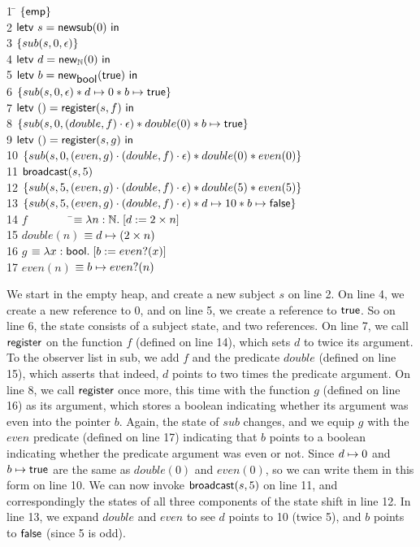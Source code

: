 \documentclass[preprint,natbib]{sigplanconf}
\begin{document}
{\small
\begin{tabbing}
1 \qquad \= 
$\{{\mathsf{emp}}\}$ \\
2 \> 
$\mbox{\textsf{{letv }}}s = \mbox{\textsf{{newsub}}}(0)\mbox{\textsf{{ in }}}$ \\
3 \> $\{{sub(s, 0, \epsilon)}\}$ \\
4 \> $\mbox{\textsf{{letv }}}d = \mbox{\textsf{{new}}}_{\mathbb{N}} (0)\mbox{\textsf{{ in }}}$ \\
5 \> $\mbox{\textsf{{letv }}}b = \mbox{\textsf{{new}}}_{\mbox{\textsf{{bool}}}} (\mbox{\textsf{{true}}})\mbox{\textsf{{ in }}}$ \\
6 \> $\{{sub(s, 0, \epsilon) * d \mapsto 0 * b \mapsto \mbox{\textsf{{true}}}}\}$\\
7 \> $\mbox{\textsf{{letv }}}() = \mbox{\textsf{{register}}}(s, f)\mbox{\textsf{{ in }}}$\\
8 \> $\{{sub(s, 0, (double, f)\cdot\epsilon) * double(0) * b \mapsto \mbox{\textsf{{true}}}}\}$ \\
9 \> $\mbox{\textsf{{letv }}}() = \mbox{\textsf{{register}}}(s, g)\mbox{\textsf{{ in }}}$\\
10 \> $\{{sub(s, 0, (even, g)\cdot(double, f)\cdot\epsilon) * double(0) * even(0)}\}$ \\
11 \> $\mbox{\textsf{{broadcast}}}(s, 5)$ \\
12 \> $\{{sub(s, 5, (even, g)\cdot(double, f)\cdot\epsilon) * double(5) * even(5)}\}$ \\
13 \> $\{{sub(s, 5, (even, g)\cdot(double, f)\cdot\epsilon) * d \mapsto 10 * b \mapsto \mbox{\textsf{{false}}}}\}$ 
\\[0.5em]
14 \> $f \qquad \qquad $\=$\equiv \lambda n:\mathbb{N}.\; [d := 2 \times n]$ \\
15 \> $double(n)$ \> $\equiv d \mapsto (2 \times n)$ \\
16 \> $g$ \> $\equiv \lambda x:\mbox{\textsf{{bool}}}.\; [b := even?(x)]$ \\
17 \> $even(n)$ \> $\equiv b \mapsto even?(n)$ \\
\end{tabbing}
}
We start in the empty heap, and create a new subject $s$ on line 2.
On line 4, we create a new reference to $0$, and on line 5, we create
a reference to $\mbox{\textsf{{true}}}$. So on line 6, the state consists of a
subject state, and two references.  On line 7, we call
$\mbox{\textsf{{register}}}$ on the function $f$ (defined on line 14), which
sets $d$ to twice its argument. To the observer list in sub, we add
$f$ and the predicate $double$ (defined on line 15), which asserts
that indeed, $d$ points to two times the predicate argument. On line
8, we call $\mbox{\textsf{{register}}}$ once more, this time with the function
$g$ (defined on line 16) as its argument, which stores a boolean
indicating whether its argument was even into the pointer $b$. Again,
the state of $sub$ changes, and we equip $g$ with the $even$ predicate
(defined on line 17) indicating that $b$ points to a boolean
indicating whether the predicate argument was even or not. Since $d
\mapsto 0$ and $b \mapsto \mbox{\textsf{{true}}}$ are the same as
$double(0)$ and $even(0)$, so we can write them in this form on line
10.  We can now invoke $\mbox{\textsf{{broadcast}}}(s, 5)$ on line 11, and
correspondingly the states of all three components of the state shift
in line 12.  In line 13, we expand $double$ and $even$ to see $d$
points to 10 (twice 5), and $b$ points to $\mbox{\textsf{{false}}}$ (since 5
is odd).
\end{document}
